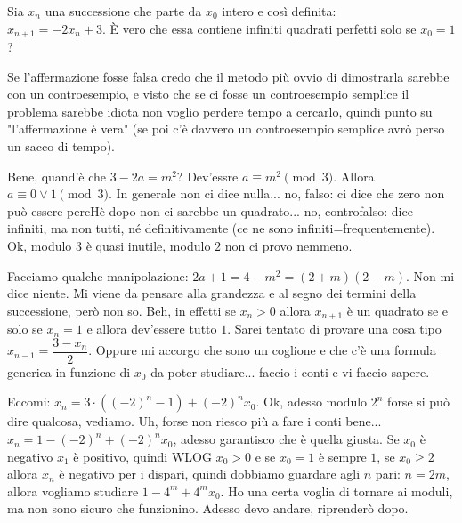 \begin{prob}
  Sia $x_n$ una successione che parte da $x_0$ intero e così definita: \\ $x_{n+1}=-2x_n+3$. È vero che essa contiene infiniti quadrati perfetti solo se $x_0=1$?
\end{prob}

\begin{sol}
  Se l'affermazione fosse falsa credo che il metodo più ovvio di dimostrarla sarebbe con un controesempio, e visto che se ci fosse un controesempio semplice il problema sarebbe idiota non voglio perdere tempo a cercarlo, quindi punto su "l'affermazione è vera" (se poi c'è davvero un controesempio semplice avrò perso un sacco di tempo).

  Bene, quand'è che $3-2a=m^2$? Dev'essre $a \equiv m^2 \pmod{3}$. Allora $a \equiv 0 \lor 1 \pmod{3}$. In generale non ci dice nulla... no, falso: ci dice che zero non può essere percHè dopo non ci sarebbe un quadrato... no, controfalso: dice infiniti, ma non tutti, né definitivamente (ce ne sono infiniti=frequentemente). Ok, modulo $3$ è quasi inutile, modulo $2$ non ci provo nemmeno.

  Facciamo qualche manipolazione: $2a+1=4-m^2=(2+m)(2-m)$. Non mi dice niente. Mi viene da pensare alla grandezza e al segno dei termini della successione, però non so. Beh, in effetti se $x_n>0$ allora $x_{n+1}$ è un quadrato se e solo se $x_n=1$ e allora dev'essere tutto $1$. Sarei tentato di provare una cosa tipo $x_{n-1}=\dfrac{3-x_n}{2}$. Oppure mi accorgo che sono un coglione e che c'è una formula generica in funzione di $x_0$ da poter studiare... faccio i conti e vi faccio sapere.

  Eccomi: $x_n=3\cdot((-2)^n-1)+(-2)^nx_0$. Ok, adesso modulo $2^n$ forse si può dire qualcosa, vediamo. Uh, forse non riesco più a fare i conti bene... $x_n=1-(-2)^n+(-2)^nx_0$, adesso garantisco che è quella giusta. Se $x_0$ è negativo $x_1$ è positivo, quindi WLOG $x_0>0$ e se $x_0=1$ è sempre $1$, se $x_0 \ge 2$ allora $x_n$ è negativo per i dispari, quindi dobbiamo guardare agli $n$ pari: $n=2m$, allora vogliamo studiare $1-4^m+4^mx_0$. Ho una certa voglia di tornare ai moduli, ma non sono sicuro che funzionino. Adesso devo andare, riprenderò dopo.


\end{sol}
